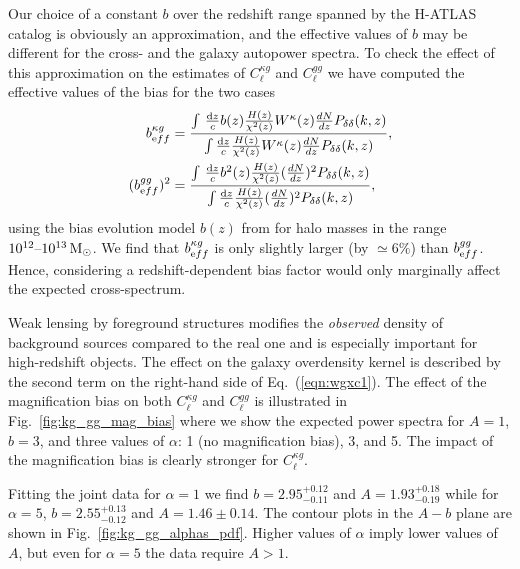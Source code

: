 Our choice of a constant $b$ over the redshift range spanned by the H-ATLAS catalog is obviously an approximation, and the effective values of $b$ may be different for the cross- and the galaxy autopower spectra. To check the effect of this approximation on the estimates of $C_{\ell}^{\kappa g}$ and $C_{\ell}^{gg}$ we have computed the effective values of the bias for the two cases
%
\begin{equation}
\label{eqn:b_eff}
\begin{split}
b_{\rm eff}^{\kappa g} &= \frac{\int \,\frac{\diff z}{c}b(z)\frac{H(z)}{\chi^2(z)}W^{\kappa}(z)\frac{dN}{dz}P_{\delta\delta}(k,z)}{\int\frac{\diff z}{c}\frac{H(z)}{\chi^2(z)} W^{\kappa}(z)\frac{dN}{dz}P_{\delta\delta}(k,z)},\\
(b_{\rm eff}^{gg})^2 &= \frac{\int \,\frac{\diff z}{c}b^2(z)\frac{H(z)}{\chi^2(z)}(\frac{dN}{dz})^2P_{\delta\delta}(k,z)}{\int\frac{\diff z}{c}\frac{H(z)}{\chi^2(z)}(\frac{dN}{dz})^2 P_{\delta\delta}(k,z)},
\end{split}
\end{equation}
%
using the bias evolution model $b(z)$ from \cite{Sheth1999} for halo masses in the range $10^{12}\hbox{--} 10^{13}\,\hbox{M}_{\odot}$. We find that $b_{\rm eff}^{\kappa g}$ is only slightly larger (by $\simeq 6\%$) than $b_{\rm eff}^{gg}$. Hence, considering a redshift-dependent bias factor would only marginally affect the expected cross-spectrum.


Weak lensing by foreground structures modifies the \textit{observed} density of background sources compared to the real one \citep{Ho2008,Xia2009} and is especially important for high-redshift objects. The effect on the galaxy overdensity kernel is described by the second term on the right-hand side of Eq.~(\eqref{eqn:wgxc1}). The effect of the magnification bias on both $C_{\ell}^{\kappa g}$ and $C_{\ell}^{gg}$ is illustrated in  Fig.~\eqref{fig:kg_gg_mag_bias} where we show the expected power spectra for $A=1$, $b=3$, and three values of $\alpha$: 1 (no magnification bias), 3, and 5. The impact of the magnification bias is clearly stronger for $C_{\ell}^{\kappa g}$.

Fitting the joint data for $\alpha=1$ we find  $b=2.95^{+0.12}_{-0.11}$ and  $A=1.93^{+0.18}_{-0.19 }$ while for $\alpha=5$, $b=2.55^{+0.13}_{-0.12}$ and  $A=1.46 \pm 0.14$. The contour plots in the $A-b$ plane are shown in Fig.~\eqref{fig:kg_gg_alphas_pdf}. Higher values of $\alpha$ imply lower values of $A$, but even for $\alpha = 5$ the data require $A>1$.

